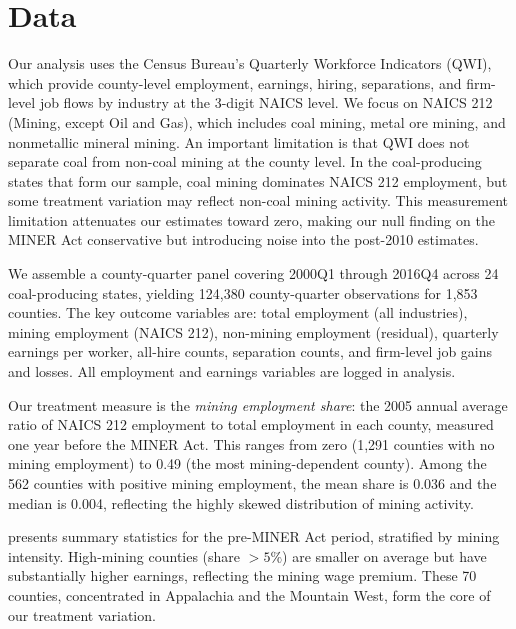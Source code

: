 \documentclass[12pt]{article}
\begin{document}
\section{Data}
\label{sec:data}

Our analysis uses the Census Bureau's Quarterly Workforce Indicators (QWI), which provide county-level employment, earnings, hiring, separations, and firm-level job flows by industry at the 3-digit NAICS level. We focus on NAICS 212 (Mining, except Oil and Gas), which includes coal mining, metal ore mining, and nonmetallic mineral mining. An important limitation is that QWI does not separate coal from non-coal mining at the county level. In the coal-producing states that form our sample, coal mining dominates NAICS 212 employment, but some treatment variation may reflect non-coal mining activity. This measurement limitation attenuates our estimates toward zero, making our null finding on the MINER Act conservative but introducing noise into the post-2010 estimates.

We assemble a county-quarter panel covering 2000Q1 through 2016Q4 across 24 coal-producing states, yielding 124,380 county-quarter observations for 1,853 counties. The key outcome variables are: total employment (all industries), mining employment (NAICS 212), non-mining employment (residual), quarterly earnings per worker, all-hire counts, separation counts, and firm-level job gains and losses. All employment and earnings variables are logged in analysis.

Our treatment measure is the \textit{mining employment share}: the 2005 annual average ratio of NAICS 212 employment to total employment in each county, measured one year before the MINER Act. This ranges from zero (1,291 counties with no mining employment) to 0.49 (the most mining-dependent county). Among the 562 counties with positive mining employment, the mean share is 0.036 and the median is 0.004, reflecting the highly skewed distribution of mining activity.

 presents summary statistics for the pre-MINER Act period, stratified by mining intensity. High-mining counties (share $> 5\%$) are smaller on average but have substantially higher earnings, reflecting the mining wage premium. These 70 counties, concentrated in Appalachia and the Mountain West, form the core of our treatment variation.
\end{document}
